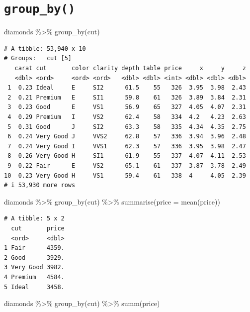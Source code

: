 \documentclass[
  letterpaper,
]{ctexbook}
\newenvironment{Shaded}{\begin{snugshade}}{\end{snugshade}}
\newcommand{\AttributeTok}[1]{\textcolor[rgb]{0.40,0.45,0.13}{#1}}
\newcommand{\FunctionTok}[1]{\textcolor[rgb]{0.28,0.35,0.67}{#1}}
\newcommand{\NormalTok}[1]{\textcolor[rgb]{0.00,0.23,0.31}{#1}}
\newcommand{\SpecialCharTok}[1]{\textcolor[rgb]{0.37,0.37,0.37}{#1}}
\begin{document}
\hypertarget{group_by}{%
\section{\texorpdfstring{\texttt{group\_by()}}{group\_by()}}\label{group_by}}

\begin{Shaded}
\begin{Highlighting}[]
\NormalTok{diamonds }\SpecialCharTok{\%\textgreater{}\%}
  \FunctionTok{group\_by}\NormalTok{(cut)}
\end{Highlighting}
\end{Shaded}

\begin{verbatim}
# A tibble: 53,940 x 10
# Groups:   cut [5]
   carat cut       color clarity depth table price     x     y     z
   <dbl> <ord>     <ord> <ord>   <dbl> <dbl> <int> <dbl> <dbl> <dbl>
 1  0.23 Ideal     E     SI2      61.5    55   326  3.95  3.98  2.43
 2  0.21 Premium   E     SI1      59.8    61   326  3.89  3.84  2.31
 3  0.23 Good      E     VS1      56.9    65   327  4.05  4.07  2.31
 4  0.29 Premium   I     VS2      62.4    58   334  4.2   4.23  2.63
 5  0.31 Good      J     SI2      63.3    58   335  4.34  4.35  2.75
 6  0.24 Very Good J     VVS2     62.8    57   336  3.94  3.96  2.48
 7  0.24 Very Good I     VVS1     62.3    57   336  3.95  3.98  2.47
 8  0.26 Very Good H     SI1      61.9    55   337  4.07  4.11  2.53
 9  0.22 Fair      E     VS2      65.1    61   337  3.87  3.78  2.49
10  0.23 Very Good H     VS1      59.4    61   338  4     4.05  2.39
# i 53,930 more rows
\end{verbatim}

\begin{Shaded}
\begin{Highlighting}[]
\NormalTok{diamonds }\SpecialCharTok{\%\textgreater{}\%}
  \FunctionTok{group\_by}\NormalTok{(cut) }\SpecialCharTok{\%\textgreater{}\%}
  \FunctionTok{summarise}\NormalTok{(}\AttributeTok{price =} \FunctionTok{mean}\NormalTok{(price))}
\end{Highlighting}
\end{Shaded}

\begin{verbatim}
# A tibble: 5 x 2
  cut       price
  <ord>     <dbl>
1 Fair      4359.
2 Good      3929.
3 Very Good 3982.
4 Premium   4584.
5 Ideal     3458.
\end{verbatim}

\begin{Shaded}
\begin{Highlighting}[]
\NormalTok{diamonds }\SpecialCharTok{\%\textgreater{}\%}
  \FunctionTok{group\_by}\NormalTok{(cut) }\SpecialCharTok{\%\textgreater{}\%}
  \FunctionTok{summ}\NormalTok{(price)}
\end{Highlighting}
\end{Shaded}
\end{document}
